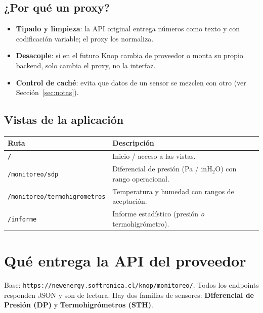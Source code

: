 \documentclass[11pt,a4paper]{article}
\newcommand{\code}[1]{\texttt{\small #1}}
\begin{document}
\subsection{¿Por qué un proxy?}
\begin{itemize}[leftmargin=1.4em]
  \item \textbf{Tipado y limpieza}: la API original entrega números como texto y con codificación
        variable; el proxy los normaliza.
  \item \textbf{Desacople}: si en el futuro Knop cambia de proveedor o monta su propio backend,
        solo cambia el proxy, no la interfaz.
  \item \textbf{Control de caché}: evita que datos de un sensor se mezclen con otro
        (ver Sección~\ref{sec:notas}).
\end{itemize}

\subsection{Vistas de la aplicación}
\begin{center}
\begin{tabular}{@{}p{4.6cm}p{9.8cm}@{}}
\toprule
\textbf{Ruta} & \textbf{Descripción} \\
\midrule
\code{/} & Inicio / acceso a las vistas. \\
\code{/monitoreo/sdp} & Diferencial de presión (Pa / inH$_2$O) con rango operacional. \\
\code{/monitoreo/termohigrometros} & Temperatura y humedad con rangos de aceptación. \\
\code{/informe} & Informe estadístico (presión \emph{o} termohigrómetro). \\
\bottomrule
\end{tabular}
\end{center}

\section{Qué entrega la API del proveedor}

Base: \code{https://newenergy.softronica.cl/knop/monitoreo/}. Todos los endpoints responden
JSON y son de lectura. Hay dos familias de sensores: \textbf{Diferencial de Presión (DP)} y
\textbf{Termohigrómetros (STH)}.
\end{document}
